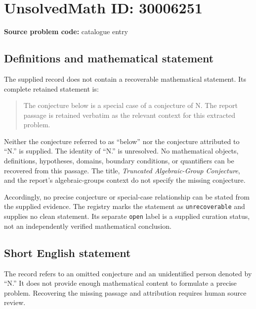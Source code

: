 \documentclass[11pt]{article}
\begin{document}
\section*{UnsolvedMath ID: 30006251}
\textbf{Source problem code:} catalogue entry
\subsection{Definitions and mathematical statement}
The supplied record does not contain a recoverable mathematical statement. Its complete retained statement is:
\begin{quote}
The conjecture below is a special case of a conjecture of N. The report passage is retained verbatim as the relevant context for this extracted problem.
\end{quote}
Neither the conjecture referred to as ``below'' nor the conjecture attributed to ``N.'' is supplied. The identity of ``N.'' is unresolved. No mathematical objects, definitions, hypotheses, domains, boundary conditions, or quantifiers can be recovered from this passage. The title, \emph{Truncated Algebraic-Group Conjecture}, and the report's algebraic-groups context do not specify the missing conjecture.

Accordingly, no precise conjecture or special-case relationship can be stated from the supplied evidence. The registry marks the statement as \texttt{unrecoverable} and supplies no clean statement. Its separate \texttt{open} label is a supplied curation status, not an independently verified mathematical conclusion.
\subsection{Short English statement}
The record refers to an omitted conjecture and an unidentified person denoted by ``N.'' It does not provide enough mathematical content to formulate a precise problem. Recovering the missing passage and attribution requires human source review.
\end{document}
